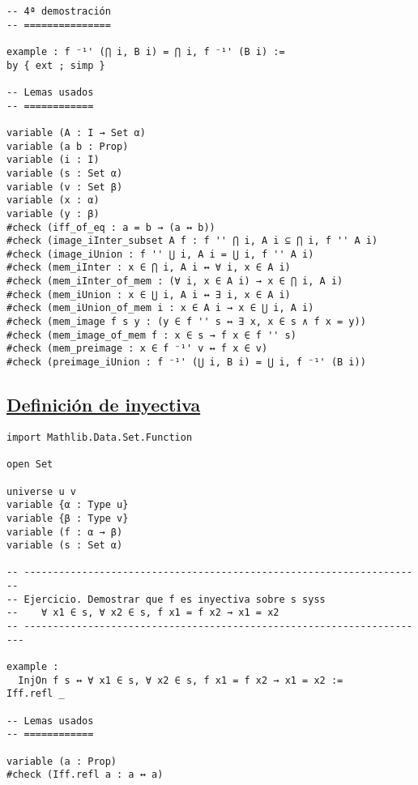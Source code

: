 \begin{verbatim}
-- 4ª demostración
-- ===============

example : f ⁻¹' (⋂ i, B i) = ⋂ i, f ⁻¹' (B i) :=
by { ext ; simp }

-- Lemas usados
-- ============

variable (A : I → Set α)
variable (a b : Prop)
variable (i : I)
variable (s : Set α)
variable (v : Set β)
variable (x : α)
variable (y : β)
#check (iff_of_eq : a = b → (a ↔ b))
#check (image_iInter_subset A f : f '' ⋂ i, A i ⊆ ⋂ i, f '' A i)
#check (image_iUnion : f '' ⋃ i, A i = ⋃ i, f '' A i)
#check (mem_iInter : x ∈ ⋂ i, A i ↔ ∀ i, x ∈ A i)
#check (mem_iInter_of_mem : (∀ i, x ∈ A i) → x ∈ ⋂ i, A i)
#check (mem_iUnion : x ∈ ⋃ i, A i ↔ ∃ i, x ∈ A i)
#check (mem_iUnion_of_mem i : x ∈ A i → x ∈ ⋃ i, A i)
#check (mem_image f s y : (y ∈ f '' s ↔ ∃ x, x ∈ s ∧ f x = y))
#check (mem_image_of_mem f : x ∈ s → f x ∈ f '' s)
#check (mem_preimage : x ∈ f ⁻¹' v ↔ f x ∈ v)
#check (preimage_iUnion : f ⁻¹' (⋃ i, B i) = ⋃ i, f ⁻¹' (B i))
\end{verbatim}

\subsection{\href{./src/Conjuntos/Definicion\_de\_inyectiva.lean}{Definición de inyectiva}}
\label{sec:orge342c5f}
\begin{verbatim}
import Mathlib.Data.Set.Function

open Set

universe u v
variable {α : Type u}
variable {β : Type v}
variable (f : α → β)
variable (s : Set α)

-- ---------------------------------------------------------------------
-- Ejercicio. Demostrar que f es inyectiva sobre s syss
--    ∀ x1 ∈ s, ∀ x2 ∈ s, f x1 = f x2 → x1 = x2
-- ----------------------------------------------------------------------

example :
  InjOn f s ↔ ∀ x1 ∈ s, ∀ x2 ∈ s, f x1 = f x2 → x1 = x2 :=
Iff.refl _

-- Lemas usados
-- ============

variable (a : Prop)
#check (Iff.refl a : a ↔ a)
\end{verbatim}

